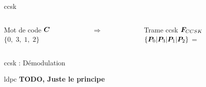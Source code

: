 \documentclass[../main.tex]{subfiles}
\begin{document}
\begin{frame}{\acrfull{ccsk}}
  \begin{overlayarea}{\linewidth}{.2 \textheight}
    \begin{columns}
      \begin{column}{.3\linewidth} \centering
        Mot de code $\bm{C}$\\$\{ 0, \; 3, \; 1,\; 2\}$
      \end{column}
      \begin{column}{.1\linewidth} \centering
        $\Rightarrow$
      \end{column}
      \begin{column}{.55\linewidth} \centering
        Trame \acrshort{ccsk} $\bm{F}_{CCSK}$\\$\{ \bm{P}_{0} | \bm{P}_{3} | \bm{P}_{1} | \bm{P}_{2} \}$ = \Ob{}\Xb{}\Xb{}\Xb{}~~\Xb{}\Xb{}\Xb{}\Ob{}~~\Xb{}\Ob{}\Xb{}\Xb{}~~\Xb{}\Xb{}\Ob{}\Xb{}
      \end{column}
    \end{columns}

  \end{overlayarea}
\end{frame}


\begin{frame}{\acrshort{ccsk} : Démodulation}

\end{frame}

\begin{frame}{\acrfull{ldpc}}
  \textbf{TODO, Juste le principe}
\end{frame}
\end{document}
